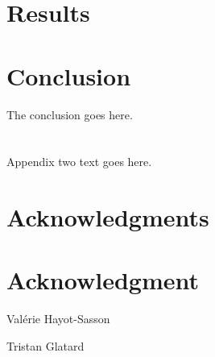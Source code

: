 \documentclass[10pt,journal,compsoc]{IEEEtran}
\begin{document}
\section{Results}


\section{Conclusion}
The conclusion goes here.






%


\appendices
\section{}
Appendix two text goes here.


\ifCLASSOPTIONcompsoc
  \section*{Acknowledgments}
\else
  \section*{Acknowledgment}
\fi

\ifCLASSOPTIONcaptionsoff
  \newpage
\fi




\begin{IEEEbiography}{Val\'erie Hayot-Sasson}
\end{IEEEbiography}
\begin{IEEEbiography}{Tristan Glatard}
\end{IEEEbiography}
\end{document}
